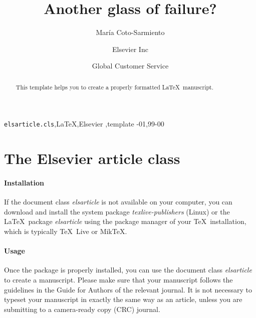 \documentclass[review]{elsarticle}
\begin{document}
\begin{frontmatter}

\title{Another glass of failure? }

\author{Mar\'ia Coto-Sarmiento}
\address{Radarweg 29, Amsterdam}

\author[mymainaddress,mysecondaryaddress]{Elsevier Inc}

\author[mysecondaryaddress]{Global Customer Service}

\address[mymainaddress]{1600 John F Kennedy Boulevard, Philadelphia}
\address[mysecondaryaddress]{360 Park Avenue South, New York}

\begin{abstract}
This template helps you to create a properly formatted \LaTeX\ manuscript.
\end{abstract}

\begin{keyword}
\texttt{elsarticle.cls}\sep \LaTeX\sep Elsevier \sep template
-01\sep  99-00
\end{keyword}

\end{frontmatter}

\linenumbers

\section{The Elsevier article class}

\paragraph{Installation} If the document class \emph{elsarticle} is not available on your computer, you can download and install the system package \emph{texlive-publishers} (Linux) or the \LaTeX\ package \emph{elsarticle} using the package manager of your \TeX\ installation, which is typically \TeX\ Live or Mik\TeX.

\paragraph{Usage} Once the package is properly installed, you can use the document class \emph{elsarticle} to create a manuscript. Please make sure that your manuscript follows the guidelines in the Guide for Authors of the relevant journal. It is not necessary to typeset your manuscript in exactly the same way as an article, unless you are submitting to a camera-ready copy (CRC) journal.
\end{document}
